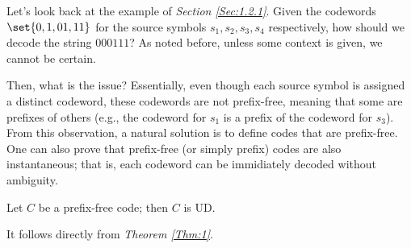 \documentclass{subfiles}
\begin{document}
    Let's look back at the example of \emph{Section \ref{Sec:1.2.1}}. 
        Given the codewords \(\set{0, 1, 01, 11}\) for the source symbols \(s_{1}, s_{2}, s_{3}, s_{4}\) respectively,
        how should we decode the string \(000111\)?
        As noted before, unless some context is given, we cannot be certain.

    Then, what is the issue? 
        Essentially, even though each source symbol is assigned a distinct codeword,
        these codewords are not prefix-free, meaning that some are prefixes of others
        (e.g., the codeword for \(s_{1}\) is a prefix of the codeword for \(s_{3}\)).
        From this observation, a natural solution is to define codes that are prefix-free.
        One can also prove that prefix-free (or simply prefix) codes are also instantaneous;
        that is, each codeword can be immidiately decoded without ambiguity.

    \begin{theorem*}
        Let \(C\) be a prefix-free code; then \(C\) is UD.
    \end{theorem*}

    \begin{proof*}
        It follows directly from \emph{Theorem \ref{Thm:1}}.
    \end{proof*}
\end{document}
